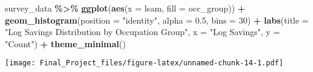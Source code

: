 \documentclass[
]{article}
\newenvironment{Shaded}{\begin{snugshade}}{\end{snugshade}}
\newcommand{\AttributeTok}[1]{\textcolor[rgb]{0.13,0.29,0.53}{#1}}
\newcommand{\DecValTok}[1]{\textcolor[rgb]{0.00,0.00,0.81}{#1}}
\newcommand{\FloatTok}[1]{\textcolor[rgb]{0.00,0.00,0.81}{#1}}
\newcommand{\FunctionTok}[1]{\textcolor[rgb]{0.13,0.29,0.53}{\textbf{#1}}}
\newcommand{\NormalTok}[1]{#1}
\newcommand{\SpecialCharTok}[1]{\textcolor[rgb]{0.81,0.36,0.00}{\textbf{#1}}}
\newcommand{\StringTok}[1]{\textcolor[rgb]{0.31,0.60,0.02}{#1}}
\begin{document}
\begin{Shaded}
\begin{Highlighting}[]
\NormalTok{survey\_data }\SpecialCharTok{\%\textgreater{}\%}
  \FunctionTok{ggplot}\NormalTok{(}\FunctionTok{aes}\NormalTok{(}\AttributeTok{x =}\NormalTok{ lsam, }\AttributeTok{fill =}\NormalTok{ occ\_group)) }\SpecialCharTok{+}
  \FunctionTok{geom\_histogram}\NormalTok{(}\AttributeTok{position =} \StringTok{"identity"}\NormalTok{, }\AttributeTok{alpha =} \FloatTok{0.5}\NormalTok{, }\AttributeTok{bins =} \DecValTok{30}\NormalTok{) }\SpecialCharTok{+}
  \FunctionTok{labs}\NormalTok{(}\AttributeTok{title =} \StringTok{"Log Savings Distribution by Occupation Group"}\NormalTok{,}
       \AttributeTok{x =} \StringTok{"Log Savings"}\NormalTok{, }\AttributeTok{y =} \StringTok{"Count"}\NormalTok{) }\SpecialCharTok{+}
  \FunctionTok{theme\_minimal}\NormalTok{()}
\end{Highlighting}
\end{Shaded}

\texttt{[image: Final\_Project\_files/figure-latex/unnamed-chunk-14-1.pdf]}
\end{document}
